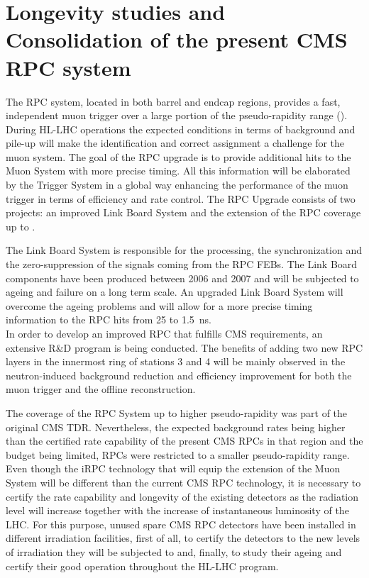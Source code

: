 \renewcommand\evenpagerightmark{{\scshape\small Chapter 5}}
\renewcommand\oddpageleftmark{{\scshape\small Longevity studies and Consolidation of the present CMS RPC system}}

\renewcommand{\bibname}{References}

\hyphenation{}

\chapter[Longevity studies and Consolidation of the present CMS RPC system]{Longevity studies and Consolidation of the present CMS RPC system}
\label{chapt5}
    
	The RPC system, located in both barrel and endcap regions, provides a fast, independent muon trigger over a large portion of the pseudo-rapidity range (). During HL-LHC operations the expected conditions in terms of background and pile-up will make the identification and correct \pT assignment a challenge for the muon system. The goal of the RPC upgrade is to provide additional hits to the Muon System with more precise timing. All this information will be elaborated by the Trigger System in a global way enhancing the performance of the muon trigger in terms of efficiency and rate control. The RPC Upgrade consists of two projects: an improved Link Board System and the extension of the RPC coverage up to .

	The Link Board System is responsible for the processing, the synchronization and the zero-suppression of the signals coming from the RPC FEBs. The Link Board components have been produced between 2006 and 2007 and will be subjected to ageing and failure on a long term scale. An upgraded Link Board System will overcome the ageing problems and will allow for a more precise timing information to the RPC hits from 25 to \SI{1.5}{ns}.\\
	In order to develop an improved RPC that fulfills CMS requirements, an extensive R\&D program is being conducted. The benefits of adding two new RPC layers in the innermost ring of stations 3 and 4 will be mainly observed in the neutron-induced background reduction and efficiency improvement for both the muon trigger and the offline reconstruction.

	The coverage of the RPC System up to higher pseudo-rapidity  was part of the original CMS TDR. Nevertheless, the expected background rates being higher than the certified rate capability of the present CMS RPCs in that region and the budget being limited, RPCs were restricted to a smaller pseudo-rapidity range. Even though the iRPC technology that will equip the extension of the Muon System will be different than the current CMS RPC technology, it is necessary to certify the rate capability and longevity of the existing detectors as the radiation level will increase together with the increase of instantaneous luminosity of the LHC. For this purpose, unused spare CMS RPC detectors have been installed in different irradiation facilities, first of all, to certify the detectors to the new levels of irradiation they will be subjected to and, finally, to study their ageing and certify their good operation throughout the HL-LHC program.
	
